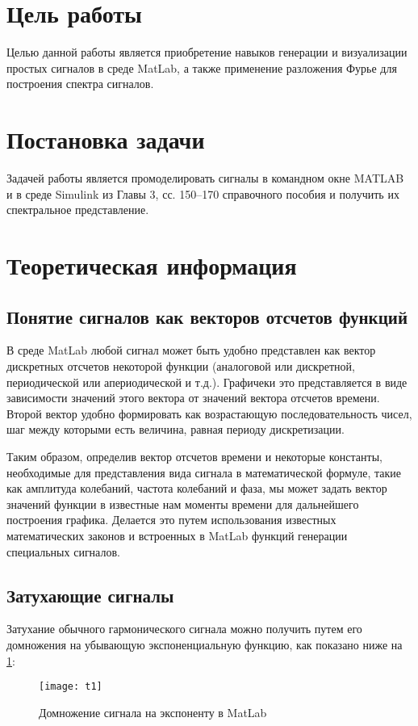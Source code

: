 







\section{Цель работы}
Целью данной работы является приобретение навыков генерации и визуализации простых сигналов в среде MatLab, а также применение разложения Фурье для построения спектра сигналов.

\section{Постановка задачи}
Задачей работы является промоделировать сигналы в командном окне MATLAB и в среде Simulink из Главы 3, сс. 150–170 справочного пособия и получить их спектральное представление.

\section{Теоретическая информация}
\subsection{Понятие сигналов как векторов отсчетов функций}
В среде  MatLab любой сигнал может быть удобно представлен как вектор дискретных отсчетов некоторой функции (аналоговой или дискретной, периодической или апериодической и т.д.). Графичеки это представляется в виде зависимости значений этого вектора от значений вектора отсчетов времени. Второй вектор удобно формировать как возрастающую последовательность чисел, шаг между которыми есть величина, равная периоду дискретизации.

Таким образом, определив вектор отсчетов времени и некоторые константы, необходимые для представления вида сигнала в математической формуле, такие как амплитуда колебаний, частота колебаний и фаза, мы может задать вектор значений функции в известные нам моменты времени для дальнейшего построения графика. Делается это путем использования известных математических законов и встроенных в MatLab функций генерации специальных сигналов.

\subsection{Затухающие сигналы}
Затухание обычного гармонического сигнала можно получить путем его домножения на убывающую экспоненциальную функцию, как показано ниже на \ref{pic:t1}:
\begin{figure}[H]
	\begin{center}
		\texttt{[image: t1]}
		\caption{Домножение сигнала на экспоненту в MatLab} 
		\label{pic:t1} %
	\end{center}
\end{figure}

